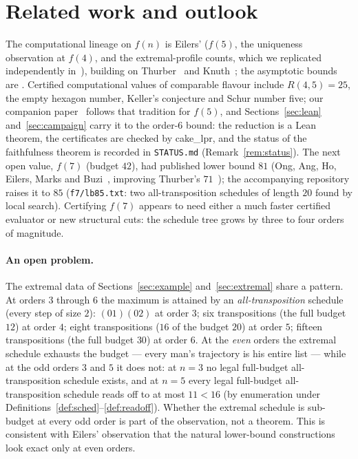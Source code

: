 \documentclass[11pt]{article}
\begin{document}
\section{Related work and outlook}\label{sec:outlook}

The computational lineage on $f(n)$ is Eilers' ($f(5)$, the uniqueness observation at $f(4)$,
and the extremal-profile counts, which we replicated independently in~\cite{f5paper}), building on
Thurber~\cite{thurber} and Knuth~\cite{knuth}; the asymptotic bounds are \cite{kow,pp}. Certified
computational values of comparable flavour include $R(4,5)=25$, the empty hexagon number, Keller's
conjecture and Schur number five; our companion paper~\cite{f5paper} follows that tradition for
$f(5)$, and Sections~\ref{sec:lean} and~\ref{sec:campaign} carry it to the order-6 bound: the
reduction is a Lean theorem, the certificates are checked by cake\_lpr, and the status of the
faithfulness theorem is recorded in \texttt{STATUS.md} (Remark~\ref{rem:status}). The next open
value, $f(7)$ (budget $42$), had published lower bound $81$ (Ong, Ang, Ho, Eilers, Marks and
Buzi~\cite{ong24}, improving Thurber's $71$~\cite{thurber}); the accompanying repository raises it
to $85$ (\texttt{f7/lb85.txt}: two all-transposition schedules of length $20$ found by local
search). Certifying $f(7)$ appears to need either a much faster certified evaluator or new
structural cuts: the schedule tree grows by three to four orders of magnitude.

\paragraph{An open problem.} The extremal data of
Sections~\ref{sec:example} and~\ref{sec:extremal} share a pattern. At orders $3$
through $6$ the maximum is attained by an \emph{all-transposition} schedule (every
step of size $2$): $(01)(02)$ at order $3$; six transpositions (the full budget
$12$) at order $4$; eight transpositions ($16$ of the budget $20$) at order $5$;
fifteen transpositions (the full budget $30$) at order $6$. At the \emph{even}
orders the extremal schedule exhausts the budget --- every man's trajectory is his
entire list --- while at the odd orders $3$ and $5$ it does not: at $n=3$ no legal full-budget
all-transposition schedule exists, and at $n=5$ every legal full-budget all-transposition
schedule reads off to at most $11<16$ (by enumeration under
Definitions~\ref{def:sched}--\ref{def:readoff}). Whether the extremal schedule is sub-budget at
every odd order is part of the observation, not a theorem. This is consistent with Eilers'
observation that the natural lower-bound constructions look exact only at even orders.
\end{document}
